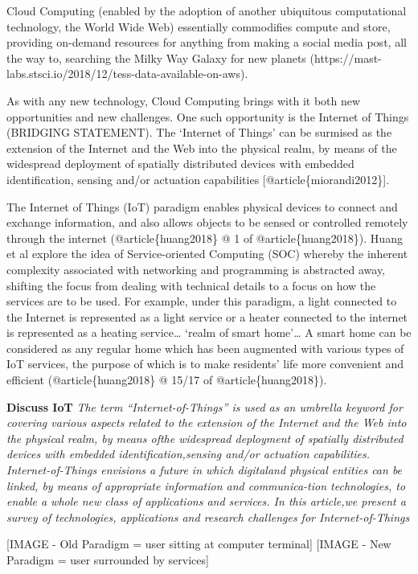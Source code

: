 \documentclass[11pt]{article}
\begin{document}
Cloud Computing (enabled by the adoption of another ubiquitous
computational technology, the World Wide Web) essentially commodifies
compute and store, providing on-demand resources for anything from
making a social media post, all the way to, searching the Milky Way
Galaxy for new planets
(https://mast-labs.stsci.io/2018/12/tess-data-available-on-aws).

As with any new technology, Cloud Computing brings with it both new
opportunities and new challenges. One such opportunity is the Internet
of Things (BRIDGING STATEMENT). The `Internet of Things' can be surmised
as the extension of the Internet and the Web into the physical realm, by
means of the widespread deployment of spatially distributed devices with
embedded identification, sensing and/or actuation capabilities
{[}@article\{miorandi2012\}{]}.

The Internet of Things (IoT) paradigm enables physical devices to
connect and exchange information, and also allows objects to be sensed
or controlled remotely through the internet (@article\{huang2018\} @ 1
of @article\{huang2018\}). Huang et al explore the idea of
Service-oriented Computing (SOC) whereby the inherent complexity
associated with networking and programming is abstracted away, shifting
the focus from dealing with technical details to a focus on how the
services are to be used. For example, under this paradigm, a light
connected to the Internet is represented as a light service or a heater
connected to the internet is represented as a heating service\ldots{}
`realm of smart home'\ldots{} A smart home can be considered as any
regular home which has been augmented with various types of IoT
services, the purpose of which is to make residents' life more
convenient and efficient (@article\{huang2018\} @ 15/17 of
@article\{huang2018\}).

\textbf{Discuss IoT} \emph{The term ``Internet-of-Things'' is used as an
umbrella keyword for covering various aspects related to the extension
of the Internet and the Web into the physical realm, by means ofthe
widespread deployment of spatially distributed devices with embedded
identification,sensing and/or actuation capabilities. Internet-of-Things
envisions a future in which digitaland physical entities can be linked,
by means of appropriate information and communica-tion technologies, to
enable a whole new class of applications and services. In this
article,we present a survey of technologies, applications and research
challenges for Internet-of-Things}

{[}IMAGE - Old Paradigm = user sitting at computer terminal{]} {[}IMAGE
- New Paradigm = user surrounded by services{]}
\end{document}

